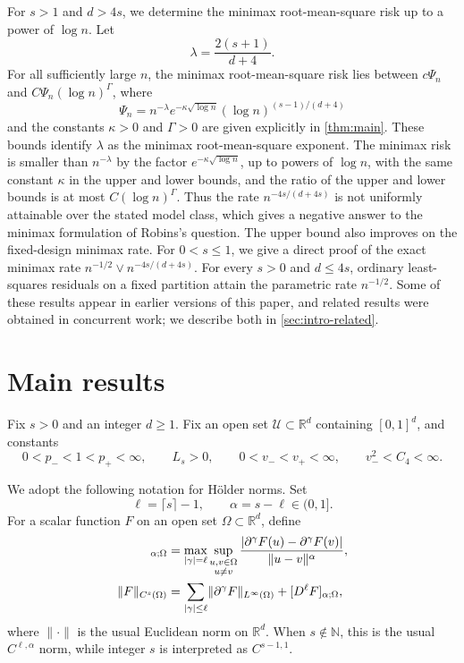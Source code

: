For $s>1$ and $d>4s$, we determine the minimax root-mean-square risk up
to a power of $\log n$. Let
\begin{equation}\label{eq:lambda}
 \lambda=\frac{2(s+1)}{d+4}.
\end{equation}
For all sufficiently large $n$, the minimax root-mean-square risk lies
between \(c\Psi_n\) and
\(C\Psi_n(\log n)^{\Gamma}\), where
\[
 \Psi_n=n^{-\lambda}e^{-\kappa\sqrt{\log n}}(\log n)^{(s-1)/(d+4)}
\]
and the constants $\kappa>0$ and $\Gamma>0$ are given explicitly in
\cref{thm:main}. These bounds identify $\lambda$ as the minimax
root-mean-square exponent. The minimax risk is smaller than $n^{-\lambda}$
by the factor $e^{-\kappa\sqrt{\log n}}$, up to powers of $\log n$,
with the same constant $\kappa$ in the upper and lower bounds, and the
ratio of the upper and lower bounds is at most $C(\log n)^\Gamma$.
Thus the rate \(n^{-4s/(d+4s)}\) is not uniformly attainable over the
stated model class, which gives a negative answer to the minimax
formulation of Robins's question. The upper bound also improves on the
fixed-design minimax rate. For $0<s\le1$, we give a direct proof of the
exact minimax rate $n^{-1/2}\vee n^{-4s/(d+4s)}$. For every $s>0$ and
$d\le4s$, ordinary least-squares residuals on a fixed partition attain
the parametric rate $n^{-1/2}$. Some of these results appear in
earlier versions of this paper, and related results were obtained in
concurrent work; we describe both in \cref{sec:intro-related}.

\section{Main results}\label{sec:main-result}
Fix \(s>0\) and an integer \(d\ge 1\). Fix an open set
\(\mathcal U\subset\mathbb R^d\) containing \([0,1]^d\), and constants
\begin{equation}\label{e:fix-constants}
 0<p_-<1<p_+<\infty,\qquad
 L_s>0,\qquad
 0<v_-<v_+<\infty,\qquad
 v_-^2<C_4<\infty.
\end{equation}

We adopt the following notation for H\"older norms.
Set
\begin{equation}\label{eq:holder-indices}
 \ell=\lceil s\rceil-1,
 \qquad \alpha=s-\ell\in(0,1].
\end{equation}
For a scalar function \(F\) on an open set
\(\Omega\subset\mathbb R^d\), define
\begin{align}
 [D^\ell F]_{\alpha;\Omega}
 &=\max_{|\gamma|=\ell}
   \sup_{\substack{u,v\in\Omega\\u\ne v}}
   \frac{|\partial^\gamma F(u)-\partial^\gamma F(v)|}
        {\|u-v\|^\alpha},
 \label{eq:holder-seminorm}\\
 \norm{F}_{C^s(\Omega)}
 &=\sum_{|\gamma|\le\ell}
   \norm{\partial^\gamma F}_{L^\infty(\Omega)}
   +[D^\ell F]_{\alpha;\Omega},
 \label{eq:holder-norm}
\end{align}
where \(\|\cdot\|\) is the usual Euclidean norm on \(\mathbb R^d\).
When \(s\notin\mathbb N\), this is the usual
\(C^{\ell,\alpha}\) norm, while integer \(s\) is interpreted as
\(C^{s-1,1}\).

